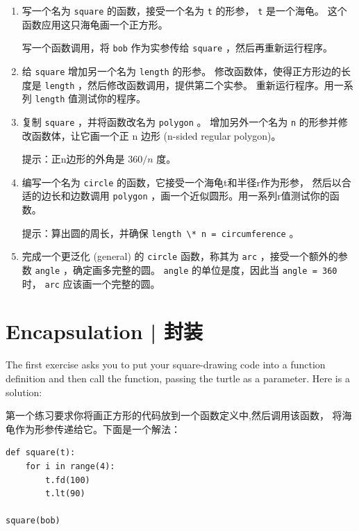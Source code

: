 \begin{enumerate}

\item 写一个名为 \lstinline{square} 的函数，接受一个名为 \lstinline{t} 的形参， \lstinline {t} 是一个海龟。 这个函数应用这只海龟画一个正方形。

写一个函数调用，将 \lstinline{bob} 作为实参传给 \lstinline{square} ，然后再重新运行程序。

\item 给 \lstinline{square} 增加另一个名为 \lstinline{length} 的形参。
 修改函数体，使得正方形边的长度是 \lstinline{length} ，然后修改函数调用，提供第二个实参。
 重新运行程序。用一系列 \lstinline{length} 值测试你的程序。

\item 复制 \lstinline{square} ，并将函数改名为 \lstinline{polygon} 。
   增加另外一个名为 \lstinline{n} 的形参并修改函数体，让它画一个正 n 边形 (n-sided regular polygon)。

提示：正n边形的外角是 $360/n$ 度。

\item 编写一个名为 \lstinline{circle} 的函数，它接受一个海龟t和半径r作为形参， 然后以合适的边长和边数调用 \lstinline{polygon} ，画一个近似圆形。用一系列r值测试你的函数。

提示：算出圆的周长，并确保 \lstinline{length \* n = circumference} 。

\item 完成一个更泛化 (general) 的 \lstinline{circle} 函数，称其为 \lstinline{arc} ，接受一个额外的参数 \lstinline{angle} ，确定画多完整的圆。 \lstinline{angle} 的单位是度，因此当 \lstinline{angle = 360} 时， \lstinline{arc} 应该画一个完整的圆。

  

\end{enumerate}


\section{Encapsulation  |  封装}

The first exercise asks you to put your square-drawing code
into a function definition and then call the function, passing
the turtle as a parameter.  Here is a solution:

第一个练习要求你将画正方形的代码放到一个函数定义中,然后调用该函数，
将海龟作为形参传递给它。下面是一个解法：

\begin{lstlisting}
def square(t):
    for i in range(4):
        t.fd(100)
        t.lt(90)

square(bob)
\end{lstlisting}

